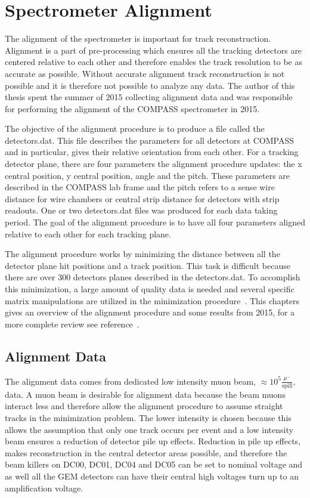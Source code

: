 \chapter{Spectrometer Alignment} \label{ch::alignment}

The alignment of the spectrometer is important for track reconstruction.
Alignment is a part of pre-processing which ensures all the tracking detectors
are centered relative to each other and therefore enables the track resolution
to be as accurate as possible.  Without accurate alignment track reconstruction
is not possible and it is therefore not possible to analyze any data.  The
author of this thesis spent the summer of 2015 collecting alignment data and was
responsible for performing the alignment of the COMPASS spectrometer in 2015.

The objective of the alignment procedure is to produce a file called the
detectors.dat.  This file describes the parameters for all detectors at COMPASS
and in particular, gives their relative orientation from each other.  For a
tracking detector plane, there are four parameters the alignment procedure
updates: the x central position, y central position, angle and the pitch.  These
parameters are described in the COMPASS lab frame and the pitch refers to a
sense wire distance for wire chambers or central strip distance for detectors
with strip readouts.  One or two detectors.dat files was produced for each data
taking period.  The goal of the alignment procedure is to have all four
parameters aligned relative to each other for each tracking plane.

The alignment procedure works by minimizing the distance between all the
detector plane hit positions and a track position.  This task is difficult
because there are over 300 detectors planes described in the detectors.dat.  To
accomplish this minimization, a large amount of quality data is needed and
several specific matrix manipulations are utilized in the minimization
procedure~\cite{matrix_inv}.  This chapters gives an overview of the alignment
procedure and some results from 2015, for a more complete review see
reference~\cite{compassAlignmentNote}.


\section{Alignment Data}

The alignment data comes from dedicated low intensity muon beam, $\approx 10^5
\frac{\mu ^-}{\mathrm{spill}}$, data.  A muon beam is desirable for alignment
data because the beam muons interact less and therefore allow the alignment
procedure to assume straight tracks in the minimization problem.  The lower
intensity is chosen because this allows the assumption that only one track
occurs per event and a low intensity beam ensures a reduction of detector pile
up effects.  Reduction in pile up effects, makes reconstruction in the central
detector areas possible, and therefore the beam killers on DC00, DC01, DC04 and
DC05 can be set to nominal voltage and as well all the GEM detectors can
have their central high voltages turn up to an amplification voltage.

